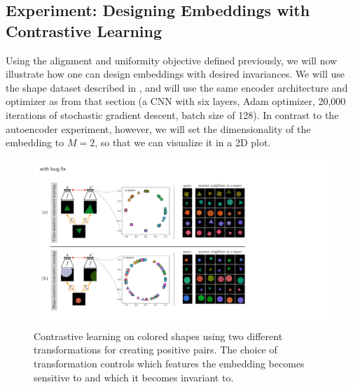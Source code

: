 \subsection{Experiment: Designing Embeddings with Contrastive Learning}\label{sec:representation_learning:expt_designing_embeddings_with_contrastive_learning}
Using the alignment and uniformity objective defined previously, we will now illustrate how one can design embeddings with desired invariances. We will use the shape dataset described in \sect{\ref{sec:representation_learning:autoencoders}}, and will use the same encoder architecture and optimizer as from that section (a CNN with six layers, Adam optimizer, 20,000 iterations of stochastic gradient descent, batch size of 128). In contrast to the autoencoder experiment, however, we will set the dimensionality of the embedding to $M=2$, so that we can visualize it in a 2D plot.

\begin{figure}[t!]
    \centerline{
        \includegraphics[width=1.0\linewidth]{figures/representation_learning/align_unif_results_shapes_dataset.pdf}}
        \caption{Contrastive learning on colored shapes using two different transformations for creating positive pairs. The choice of transformation controls which features the embedding becomes sensitive to and which it becomes invariant to.}
        \label{fig:representation_learning:align_unif_results_shapes_dataset}
    
\end{figure}

